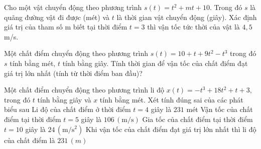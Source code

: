 \begin{ex}%
	Cho một vật chuyển động theo phương trình $s(t)=t^2+mt+10$. Trong đó $ s $ là quãng đường vật đi được (mét) và $ t $ là thời gian vật chuyển động (giây). Xác định giá trị của tham số m biết tại thời điểm $t=3$ thì vận tốc  tức thời của vật là $ 4{,}5 $ m/s.
\end{ex}

\begin{ex}%
	Một chất điểm chuyển  động theo phương trình $s(t)=10+t+9t^2-t^3$ trong đó $s$ tính bằng mét, $t$ tính bằng giây. Tính thời gian để vận tốc của chất điểm đạt giá trị lớn nhất (tính từ thời điểm ban đầu)?
\end{ex}

\begin{ex}%

Một chất điểm chuyển động theo phương trình li độ $x(t)=-t^3+18t^2+t+3$, trong đó $t$ tính bằng giây và $x$ tính bằng mét. Xét tính đúng sai của các phát biểu sau
\choiceTF
{\True Li độ của chất điểm ở thời điểm $t=4$ giây là $231$ mét}
{\True Vận tốc của chất điểm tại thời điểm $t=5$ giây là $106\, \mathrm{(m/s)}$}
{Gia tốc của chất điểm tại thời điểm $t=10$ giây là $24\, \mathrm{(m/s^2)}$}
{Khi vận tốc của chất điểm đạt giá trị lớn nhất thì li độ của chất điểm là $231\, (m)$}
\end{ex}

